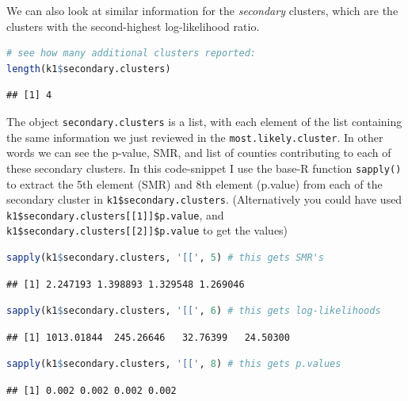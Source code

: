 \documentclass[
]{book}
\newcommand{\passthrough}[1]{#1}
\begin{document}
We can also look at similar information for the \emph{secondary} clusters, which are the clusters with the second-highest log-likelihood ratio.

\begin{lstlisting}[language=R]
# see how many additional clusters reported:
length(k1$secondary.clusters)
\end{lstlisting}

\begin{lstlisting}
## [1] 4
\end{lstlisting}

The object \passthrough{\lstinline!secondary.clusters!} is a list, with each element of the list containing the same information we just reviewed in the \passthrough{\lstinline!most.likely.cluster!}. In other words we can see the p-value, SMR, and list of counties contributing to each of these secondary clusters. In this code-snippet I use the base-R function \passthrough{\lstinline!sapply()!} to extract the 5th element (SMR) and 8th element (p.value) from each of the secondary cluster in \passthrough{\lstinline!k1$secondary.clusters!}. (Alternatively you could have used \passthrough{\lstinline!k1$secondary.clusters[[1]]$p.value!}, and \passthrough{\lstinline!k1$secondary.clusters[[2]]$p.value!} to get the values)

\begin{lstlisting}[language=R]
sapply(k1$secondary.clusters, '[[', 5) # this gets SMR's
\end{lstlisting}

\begin{lstlisting}
## [1] 2.247193 1.398893 1.329548 1.269046
\end{lstlisting}

\begin{lstlisting}[language=R]
sapply(k1$secondary.clusters, '[[', 6) # this gets log-likelihoods
\end{lstlisting}

\begin{lstlisting}
## [1] 1013.01844  245.26646   32.76399   24.50300
\end{lstlisting}

\begin{lstlisting}[language=R]
sapply(k1$secondary.clusters, '[[', 8) # this gets p.values
\end{lstlisting}

\begin{lstlisting}
## [1] 0.002 0.002 0.002 0.002
\end{lstlisting}
\end{document}
